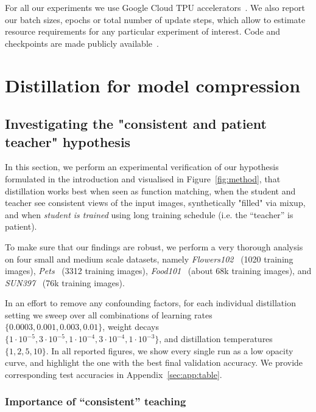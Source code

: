 \documentclass[10pt,twocolumn,letterpaper]{article}
\begin{document}
For all our experiments we use Google Cloud TPU accelerators~\cite{jouppi2017datacenter}. We also report our batch sizes, epochs or total number of update steps, which allow to estimate resource requirements for any particular experiment of interest. Code and checkpoints are made publicly available~\cite{big_vision}.

\section{Distillation for model compression}\label{sec:exp}


\subsection{Investigating the "consistent and patient teacher" hypothesis}
\label{sec:hpsweep}

In this section, we perform an experimental verification of our hypothesis formulated in the introduction and visualised in Figure~\ref{fig:method}, 
 that distillation works best when seen as function matching, \ie when the  student and teacher see consistent views of the input images, synthetically "filled" via mixup, and when \emph{student is trained} using long training schedule (i.e. the ``teacher'' is patient).

To make sure that our findings are robust, we perform a very thorough analysis on four small and medium scale datasets, namely \emph{Flowers102}~\cite{dataflowers} (1020 training images), \emph{Pets}~\cite{datapets} (3312 training images), \emph{Food101}~\cite{datafood} (about 68k training images), and \emph{SUN397}~\cite{datasun} (76k training images).

In an effort to remove any confounding factors, for each individual distillation setting we sweep over all combinations of learning rates $\{0.0003, 0.001, 0.003, 0.01\}$, weight decays $\{1\cdot10^{-5}, 3\cdot10^{-5}, 1\cdot10^{-4}, 3\cdot10^{-4}, 1\cdot10^{-3}\}$, and distillation temperatures $\{1, 2, 5, 10\}$.
In all reported figures, we show every single run as a low opacity curve, and highlight the one with the best final validation accuracy.
We provide corresponding test accuracies in Appendix~\ref{sec:app:table}.

\subsubsection{Importance of ``consistent'' teaching}
\label{sec:designchoices}
\end{document}
